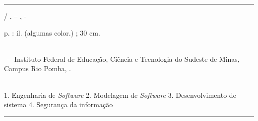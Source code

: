 \documentclass[
	12pt,				%
	openright,			%
	oneside,			%
	a4paper,			%
	english,			%
	french,				%
	spanish,			%
	brazil,				%
	]{abntex2}
\begin{document}
%
%     
\begin{fichacatalografica}
	\vspace*{\fill}					%
	\hrule							%
	\begin{center}					%
	\begin{minipage}[c]{12.5cm}		%
	
	\imprimirautor
	
	\hspace{0.5cm} \imprimirtitulo  / \imprimirautor. --
	\imprimirlocal, \imprimirdata-
	
	\hspace{0.5cm} \pageref{LastPage} p. : il. (algumas color.) ; 30 cm.\\
	
	\hspace{0.5cm} \imprimirorientadorRotulo~\imprimirorientador\\
	
	\hspace{0.5cm}
	\parbox[t]{\textwidth}{\imprimirtipotrabalho~--~Instituto Federal de Educação, Ciência e Tecnologia do Sudeste de Minas, Campus Rio Pomba,
	\imprimirdata.}\\
	
	\hspace{0.5cm}
		1. Engenharia de \textit{Software}
		2. Modelagem de \textit{Software}
		3. Desenvolvimento de sistema
        4. Segurança da informação
  \\ 			
	
	\hspace{8.75cm} %
	
	\end{minipage}
	\end{center}
	\hrule
\end{fichacatalografica}
\end{document}
